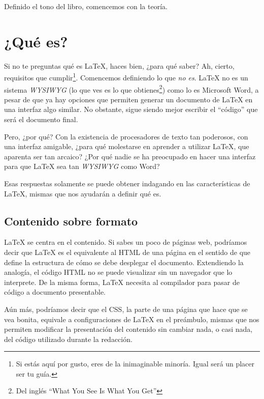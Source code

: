 Definido el tono del libro, comencemos con la teoría.



\section{¿Qué es?}
\label{sec:que_es}



Si no te preguntas qué es \LaTeX{}, haces bien, ¿para qué saber? Ah, cierto, requisitos que cumplir\footnote{Si estás aquí por gusto, eres de la inimaginable minoría. Igual será un placer ser tu guía.}. Comencemos definiendo lo que \emph{no es}. \LaTeX{} no es un sistema \emph{WYSIWYG} (lo que ves es lo que obtienes\footnote{Del inglés ``What You See Is What You Get''}) como lo es Microsoft Word, a pesar de que ya hay opciones que permiten generar un documento de \LaTeX{} en una interfaz algo similar. No obstante, sigue siendo mejor escribir el ``código'' que será el documento final.

Pero, ¿por qué? Con la existencia de procesadores de texto tan poderosos, con una interfaz amigable, ¿para qué molestarse en aprender a utilizar \LaTeX, que aparenta ser tan arcaico? ¿Por qué nadie se ha preocupado en hacer una interfaz para que \LaTeX{} sea tan \emph{WYSIWYG} como Word?

Esas respuestas solamente se puede obtener indagando en las características de \LaTeX{}, mismas que nos ayudarán a definir qué es.



\subsection{Contenido sobre formato}
\label{ssub:contenido_sobre_formato}



\LaTeX{} se centra en el contenido. Si sabes un poco de páginas web, podríamos decir que \LaTeX{} es el equivalente al HTML de una página en el sentido de que define la estructura de cómo se debe desplegar el documento. Extendiendo la analogía, el código HTML no se puede visualizar sin un navegador que lo interprete. De la misma forma, \LaTeX{} necesita al compilador para pasar de código a documento presentable.

Aún más, podríamos decir que el CSS, la parte de una página que hace que se vea bonita, equivale a configuraciones de \LaTeX{} en el preámbulo, mismas que nos permiten modificar la presentación del contenido sin cambiar nada, o casi nada, del código utilizado durante la redacción.

